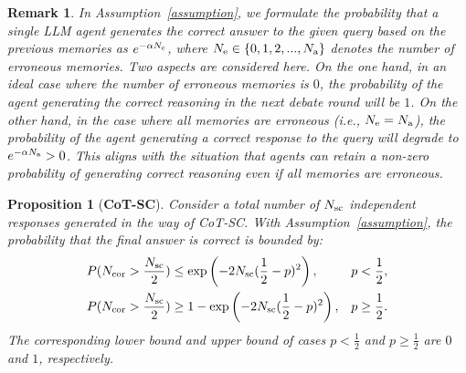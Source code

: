 \documentclass{article} %
\theoremstyle{plain}
\newtheorem{proposition}[theorem]{Proposition}
\newtheorem{remark}{Remark}
\begin{document}
\begin{remark}
    In Assumption~\ref{assumption}, we formulate the probability that a single LLM agent generates the correct answer to the given query based on the previous memories as $e^{-\alpha N_{\rm e}}$, where $N_{\rm e}\in\{0, 1, 2, ..., N_{\rm a}\}$ denotes the number of erroneous memories. Two aspects are considered here. On the one hand, in an ideal case where the number of erroneous memories is $0$, the probability of the agent generating the correct reasoning in the next debate round will be $1$. On the other hand, in the case where all memories are erroneous (i.e., $N_{\rm e}=N_{\rm a}$), the probability of the agent generating a correct response to the query will degrade to $e^{-\alpha N_{\rm a}}>0$. This aligns with the situation that agents can retain a non-zero probability of generating correct reasoning even if all memories are erroneous.
\end{remark}

\begin{proposition}[\textbf{CoT-SC}]\label{proposition:cot-sc}
    Consider a total number of $N_{\rm sc}$ independent responses generated in the way of CoT-SC. With Assumption~\ref{assumption}, the probability that the final answer is correct is bounded by:
    \[
    \begin{aligned}
        &P(N_{\rm cor}>\frac{N_{\rm sc}}{2})\leq\exp\left(-2N_{\rm sc}(\frac{1}{2}-p)^2\right) ,   &p<\frac{1}{2}, \\
        &P(N_{\rm cor}>\frac{N_{\rm sc}}{2})\geq1-\exp\left(-2N_{\rm sc}(\frac{1}{2}-p)^2\right) , &p\geq\frac{1}{2}.
    \end{aligned}
    \]
     The corresponding lower bound and upper bound of cases $p<\frac{1}{2}$ and $p\geq\frac{1}{2}$ are $0$ and $1$, respectively.
\end{proposition}
\end{document}
